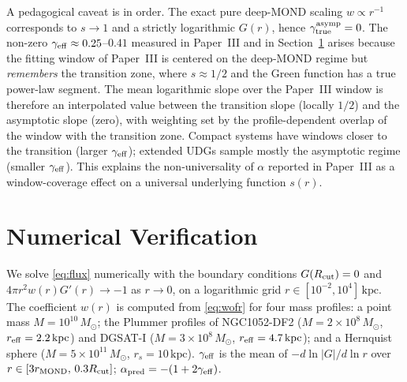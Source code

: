 \documentclass[aps,prd,twocolumn,superscriptaddress,nofootinbib]{revtex4-2}
\begin{document}
A pedagogical caveat is in order. The exact pure deep-MOND scaling
$w\propto r^{-1}$ corresponds to $s\to 1$ and a strictly
logarithmic $G(r)$, hence $\gamma_{\rm true}^{\rm asymp} = 0$. The
non-zero $\gamma_{\rm eff}\approx 0.25$--$0.41$ measured in
Paper~III and in Section~\ref{sec:numerics} arises because the
fitting window of Paper~III is centered on the deep-MOND regime but
\emph{remembers} the transition zone, where $s\approx 1/2$ and the
Green function has a true power-law segment. The mean logarithmic
slope over the Paper~III window is therefore an interpolated value
between the transition slope (locally $1/2$) and the asymptotic
slope (zero), with weighting set by the profile-dependent
overlap of the window with the transition zone. Compact systems
have windows closer to the transition (larger $\gamma_{\rm eff}$);
extended UDGs sample mostly the asymptotic regime (smaller
$\gamma_{\rm eff}$). This explains the non-universality of $\alpha$
reported in Paper~III as a window-coverage effect on a universal
underlying function $s(r)$.

\section{Numerical Verification}\label{sec:numerics}

We solve \eqref{eq:flux} numerically with the boundary conditions
$G(R_{\rm cut}) = 0$ and $4\pi r^2 w(r) G'(r)\to -1$ as $r\to 0$,
on a logarithmic grid $r\in[10^{-2},10^4]\,\mathrm{kpc}$. The
coefficient $w(r)$ is computed from \eqref{eq:wofr} for four mass
profiles: a point mass $M = 10^{10}\,M_\odot$; the Plummer profiles
of NGC1052-DF2 ($M=2\times10^8\,M_\odot$, $r_{\rm eff}=2.2\,
\mathrm{kpc}$) and DGSAT-I ($M=3\times10^8\,M_\odot$,
$r_{\rm eff}=4.7\,\mathrm{kpc}$); and a Hernquist sphere
($M = 5\times10^{11}\,M_\odot$, $r_s = 10\,\mathrm{kpc}$).
$\gamma_{\rm eff}$ is the mean of $-d\ln|G|/d\ln r$ over
$r\in[3r_{\rm MOND},\,0.3 R_{\rm cut}]$; $\alpha_{\rm pred} =
-(1+2\gamma_{\rm eff})$.
\end{document}
